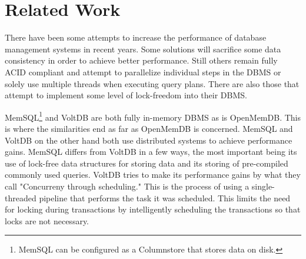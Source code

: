\documentclass[letter,11pt]{article}
\begin{document}
\section{Related Work}
There have been some attempts to increase the performance of database management
systems in recent years. Some solutions will sacrifice
some data consistency in order to achieve better performance. Still others
remain fully ACID compliant and attempt to parallelize individual steps in the 
DBMS or solely use multiple threads when executing query plans. There are also those
that attempt to implement some level of lock-freedom into their DBMS.
\par\vspace{\baselineskip}
MemSQL\footnote{MemSQL can be configured as a Columnstore that stores data on disk.}
and VoltDB are both fully in-memory DBMS as is OpenMemDB. This is where the
similarities end as far as OpenMemDB is concerned. MemSQL and VoltDB on the other 
hand both use distributed systems to achieve performance gains. MemSQL differs from 
VoltDB in a few ways, the most important being its use of lock-free data structures
for storing data and its storing of pre-compiled commonly used queries\cite{MemSQL}.
VoltDB tries to make its performance gains by what they call "Concurreny through
scheduling."\cite{VoltDB} This is the process of using a single-threaded pipeline 
that performs the task it was scheduled. This limits the need for locking during
transactions by intelligently scheduling the transactions so that locks are not
necessary.
\newpage
\end{document}
